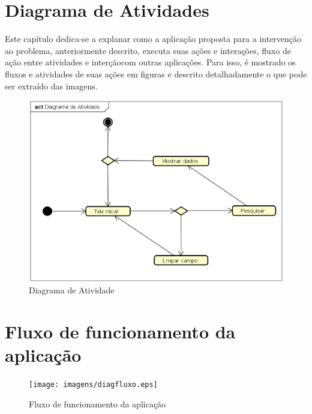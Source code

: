 
\section{Diagrama de Atividades}
Este capítulo dedica-se a explanar como a aplicação proposta para a intervenção ao problema, anteriormente descrito, executa suas ações e interações, fluxo de ação entre atividades e interçãocom outras aplicações. Para isso, é mostrado os fluxos e atividades de suas ações em figuras e descrito detalhadamente o que pode ser extraído das imagens.



\begin{figure}[!htb]
        \caption{\label{diagact}Diagrama de Atividade}
        \begin{center}
                \includegraphics[width=\textwidth]{imagens/diagact.eps}
        \end{center}
\end{figure}

\newpage
\section{Fluxo de funcionamento da aplicação}
\lipsum[3-7]

\begin{figure}[!htb]
        \caption{\label{diagfluxo}Fluxo de funcionamento da aplicação}
        \begin{center}
                \texttt{[image: imagens/diagfluxo.eps]}
        \end{center}
\end{figure}
